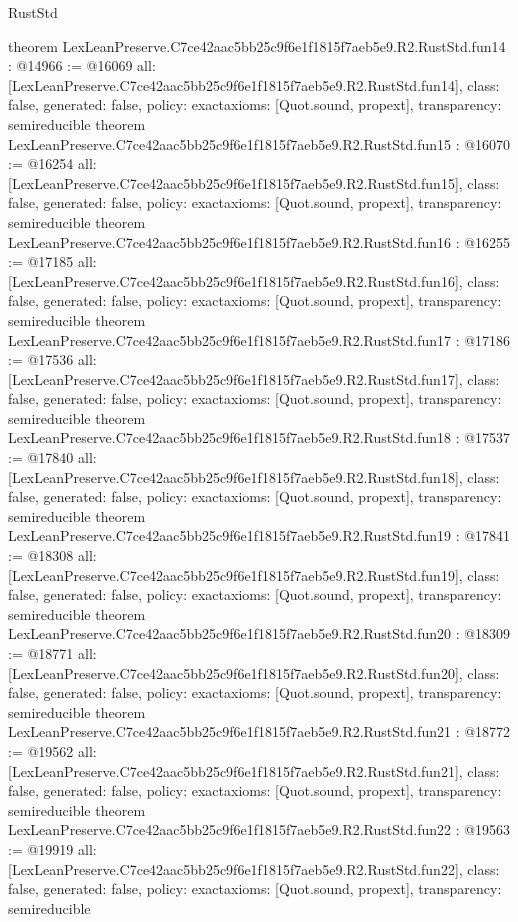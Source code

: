 \begin{lexlean}{RustStd}
\begin{coremodule}
{}
theorem LexLeanPreserve.C7ce42aac5bb25c9f6e1f1815f7aeb5e9.R2.RustStd.fun14 : @14966 := @16069 {
  all: [LexLeanPreserve.C7ce42aac5bb25c9f6e1f1815f7aeb5e9.R2.RustStd.fun14],
  class: false,
  generated: false,
  policy: exact{axioms: [Quot.sound, propext]},
  transparency: semireducible
}
theorem LexLeanPreserve.C7ce42aac5bb25c9f6e1f1815f7aeb5e9.R2.RustStd.fun15 : @16070 := @16254 {
  all: [LexLeanPreserve.C7ce42aac5bb25c9f6e1f1815f7aeb5e9.R2.RustStd.fun15],
  class: false,
  generated: false,
  policy: exact{axioms: [Quot.sound, propext]},
  transparency: semireducible
}
theorem LexLeanPreserve.C7ce42aac5bb25c9f6e1f1815f7aeb5e9.R2.RustStd.fun16 : @16255 := @17185 {
  all: [LexLeanPreserve.C7ce42aac5bb25c9f6e1f1815f7aeb5e9.R2.RustStd.fun16],
  class: false,
  generated: false,
  policy: exact{axioms: [Quot.sound, propext]},
  transparency: semireducible
}
theorem LexLeanPreserve.C7ce42aac5bb25c9f6e1f1815f7aeb5e9.R2.RustStd.fun17 : @17186 := @17536 {
  all: [LexLeanPreserve.C7ce42aac5bb25c9f6e1f1815f7aeb5e9.R2.RustStd.fun17],
  class: false,
  generated: false,
  policy: exact{axioms: [Quot.sound, propext]},
  transparency: semireducible
}
theorem LexLeanPreserve.C7ce42aac5bb25c9f6e1f1815f7aeb5e9.R2.RustStd.fun18 : @17537 := @17840 {
  all: [LexLeanPreserve.C7ce42aac5bb25c9f6e1f1815f7aeb5e9.R2.RustStd.fun18],
  class: false,
  generated: false,
  policy: exact{axioms: [Quot.sound, propext]},
  transparency: semireducible
}
theorem LexLeanPreserve.C7ce42aac5bb25c9f6e1f1815f7aeb5e9.R2.RustStd.fun19 : @17841 := @18308 {
  all: [LexLeanPreserve.C7ce42aac5bb25c9f6e1f1815f7aeb5e9.R2.RustStd.fun19],
  class: false,
  generated: false,
  policy: exact{axioms: [Quot.sound, propext]},
  transparency: semireducible
}
theorem LexLeanPreserve.C7ce42aac5bb25c9f6e1f1815f7aeb5e9.R2.RustStd.fun20 : @18309 := @18771 {
  all: [LexLeanPreserve.C7ce42aac5bb25c9f6e1f1815f7aeb5e9.R2.RustStd.fun20],
  class: false,
  generated: false,
  policy: exact{axioms: [Quot.sound, propext]},
  transparency: semireducible
}
theorem LexLeanPreserve.C7ce42aac5bb25c9f6e1f1815f7aeb5e9.R2.RustStd.fun21 : @18772 := @19562 {
  all: [LexLeanPreserve.C7ce42aac5bb25c9f6e1f1815f7aeb5e9.R2.RustStd.fun21],
  class: false,
  generated: false,
  policy: exact{axioms: [Quot.sound, propext]},
  transparency: semireducible
}
theorem LexLeanPreserve.C7ce42aac5bb25c9f6e1f1815f7aeb5e9.R2.RustStd.fun22 : @19563 := @19919 {
  all: [LexLeanPreserve.C7ce42aac5bb25c9f6e1f1815f7aeb5e9.R2.RustStd.fun22],
  class: false,
  generated: false,
  policy: exact{axioms: [Quot.sound, propext]},
  transparency: semireducible
}
\end{coremodule}
\end{lexlean}

